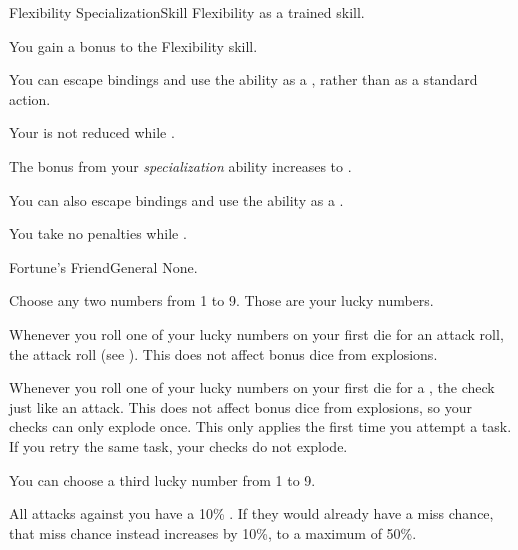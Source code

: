 
  \begin{feat}{Flexibility Specialization}{Skill}
    \featpre Flexibility as a trained skill.

     You gain a  bonus to the Flexibility skill.

     You can escape bindings and use the  ability as a , rather than as a standard action.

     Your  is not reduced while \squeezing.

     The bonus from your \textit{specialization} ability increases to .

     You can also escape bindings and use the  ability as a .

     You take no penalties while \squeezing.
  \end{feat}

  \begin{feat}{Fortune's Friend}{General}
    \featpre None.

     Choose any two numbers from 1 to 9.
    Those are your lucky numbers.

     Whenever you roll one of your lucky numbers on your first die for an attack roll, the attack roll  (see ).
    This does not affect bonus dice from explosions.

     Whenever you roll one of your lucky numbers on your first die for a , the check  just like an attack.
    This does not affect bonus dice from explosions, so your checks can only explode once.
    This only applies the first time you attempt a task.
    If you retry the same task, your checks do not explode.

     You can choose a third lucky number from 1 to 9.

     All  attacks against you have a 10\% .
    If they would already have a miss chance, that miss chance instead increases by 10\%, to a maximum of 50\%.
  \end{feat}

